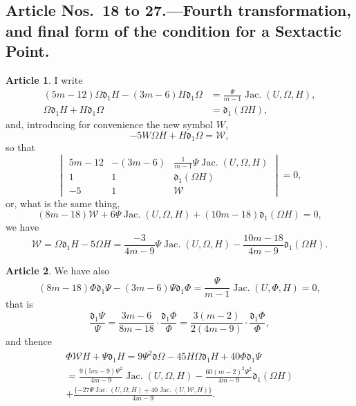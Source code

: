 \documentclass[12pt,a4paper]{article}
\theoremstyle{definition}
\newtheorem{art}{Article}[section]
\DeclareMathOperator{\Jac}{Jac.}
\begin{document}
\subsection*{Article Nos.\ 18 to 27.---Fourth transformation, and final form of the condition for a Sextactic Point.}

\begin{art}
I write
\begin{align*}
(5m - 12)\Omega\mathfrak{d}_1 H - (3m - 6)H\mathfrak{d}_1\Omega &= \frac{\Psi}{m - 1}\Jac(U, \Omega, H), \tag{J} \\
\Omega\mathfrak{d}_1 H + H\mathfrak{d}_1\Omega &= \mathfrak{d}_1(\Omega H),
\end{align*}
and, introducing for convenience the new symbol $W$,
\[
-5W\Omega H + H\mathfrak{d}_1\Omega = \mathcal{W},
\]
so that
\[
\begin{vmatrix}
5m - 12 & -(3m - 6) & \frac{1}{m - 1}\Psi\Jac(U, \Omega, H) \\
1 & 1 & \mathfrak{d}_1(\Omega H) \\
-5 & 1 & \mathcal{W}
\end{vmatrix} = 0,
\]
or, what is the same thing,
\[
(8m - 18)\mathcal{W} + 6\Psi\Jac(U, \Omega, H) + (10m - 18)\mathfrak{d}_1(\Omega H) = 0,
\]
we have
\[
\mathcal{W} = \Omega\mathfrak{d}_1 H - 5\Omega H = \frac{-3}{4m - 9}\Psi\Jac(U, \Omega, H) - \frac{10m - 18}{4m - 9}\mathfrak{d}_1(\Omega H).
\]
\end{art}

\begin{art}
We have also
\[
(8m - 18)\Phi\mathfrak{d}_1\Psi - (3m - 6)\Psi\mathfrak{d}_1\Phi = \frac{\Psi}{m - 1}\Jac(U, \Phi, H) = 0, \tag{J}
\]
that is
\[
\frac{\mathfrak{d}_1\Psi}{\Psi} = \frac{3m - 6}{8m - 18} \cdot \frac{\mathfrak{d}_1\Phi}{\Phi} = \frac{3(m - 2)}{2(4m - 9)} \cdot \frac{\mathfrak{d}_1\Phi}{\Phi},
\]
and thence
\begin{multline*}
\Phi\mathcal{W}H + \Psi\mathfrak{d}_1 H = 9\Psi^2\mathfrak{d}\Omega - 45H\Omega\mathfrak{d}_1 H + 40\Phi\mathfrak{d}_1\Psi \\
= \frac{9(5m - 9)\Psi^2}{4m - 9}\Jac(U, \Omega, H) - \frac{60(m - 2)^2\Psi^2}{4m - 9}\mathfrak{d}_1(\Omega H) \\
+ \frac{\{-27\Psi\Jac(U, \Omega, H) + 40\Jac(U, \mathcal{W}, H)\}}{4m - 9}.
\end{multline*}
\end{art}
\end{document}
